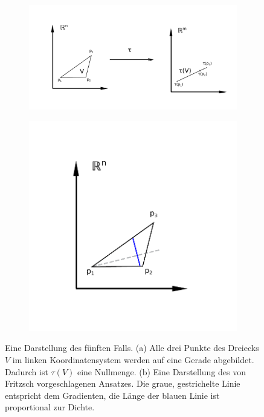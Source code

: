 \documentclass[a4paper,fontsize=12pt,toc=bib,halfparskip]{scrartcl}
\begin{document}
\begin{figure}
	\begin{subfigure}{0.66\textwidth}
		\includegraphics[width=\textwidth]{pictures/Case5}
		\subcaption{}
		\label{Case5}
	\end{subfigure}
	\begin{subfigure}{0.33\textwidth}
		\includegraphics[width=\textwidth]{pictures/Case5-Solution}
		\subcaption{}
		\label{Case5Solution}
	\end{subfigure}
	\caption{Eine Darstellung des f\"unften Falls. (a) Alle drei Punkte des Dreiecks $V$ im linken Koordinatensystem werden auf eine Gerade abgebildet. Dadurch ist $\tau(V)$ eine Nullmenge. (b) Eine Darstellung des von Fritzsch vorgeschlagenen Ansatzes. Die graue, gestrichelte Linie entspricht dem Gradienten, die L\"ange der blauen Linie ist proportional zur Dichte. }
\end{figure}
\end{document}
